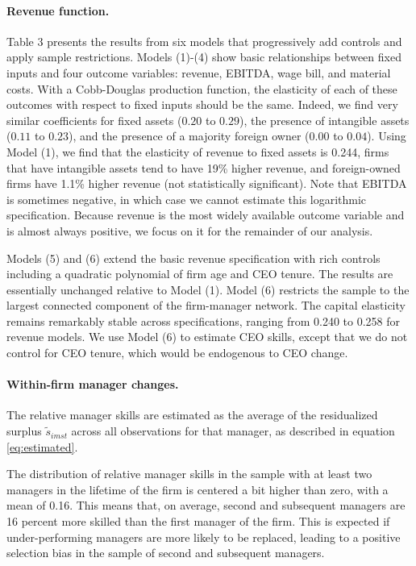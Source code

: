 \documentclass[11pt,a4paper]{article}
\begin{document}
\paragraph{Revenue function.}
Table 3 presents the results from six models that progressively add controls and apply sample restrictions. Models (1)-(4) show basic relationships between fixed inputs and four outcome variables: revenue, EBITDA, wage bill, and material costs. With a Cobb-Douglas production function, the elasticity of each of these outcomes with respect to fixed inputs should be the same. Indeed, we find very similar coefficients for fixed assets ($0.20$ to $0.29$), the presence of intangible assets ($0.11$ to $0.23$), and the presence of a majority foreign owner ($0.00$ to $0.04$). Using Model (1), we find that the elasticity of revenue to fixed assets is 0.244, firms that have intangible assets tend to have 19\% higher revenue, and foreign-owned firms have 1.1\% higher revenue (not statistically significant). Note that EBITDA is sometimes negative, in which case we cannot estimate this logarithmic specification. Because revenue is the most widely available outcome variable and is almost always positive, we focus on it for the remainder of our analysis.

Models (5) and (6) extend the basic revenue specification with rich controls including a quadratic polynomial of firm age and CEO tenure. The results are essentially unchanged relative to Model (1). Model (6) restricts the sample to the largest connected component of the firm-manager network. The capital elasticity remains remarkably stable across specifications, ranging from 0.240 to 0.258 for revenue models. We use Model (6) to estimate CEO skills, except that we do not control for CEO tenure, which would be endogenous to CEO change.



\paragraph{Within-firm manager changes.}




The relative manager skills are estimated as the average of the residualized surplus $\tilde s_{imst}$ across all observations for that manager, as described in equation \eqref{eq:estimated}. 

The distribution of relative manager skills in the sample with at least two managers in the lifetime of the firm is centered a bit higher than zero, with a mean of 0.16. This means that, on average, second and subsequent managers are 16 percent more skilled than the first manager of the firm. This is expected if under-performing managers are more likely to be replaced, leading to a positive selection bias in the sample of second and subsequent managers. 
\end{document}
